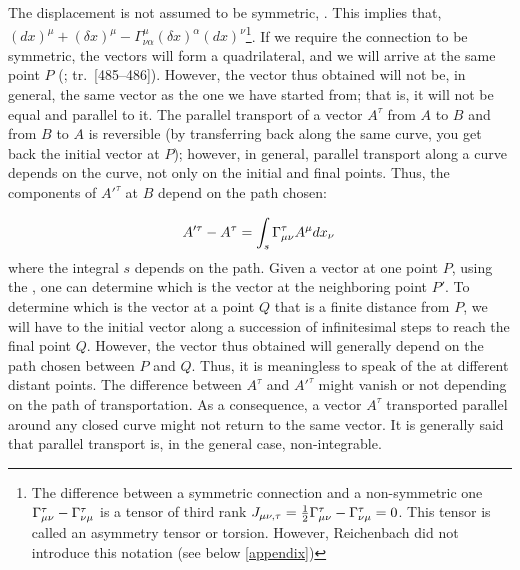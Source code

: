 \documentclass[final]{article}
\renewcommand{\rzlap}[2]{(\cite[#1]{Reichenbach1928}; tr.\ [#2])\xspace}
\begin{document}
%
The displacement is not assumed to be symmetric, \asym. This implies that,  $(d x)^{\mu}+(\delta x)^{\mu}-\Gamma_{\nu \alpha}^{\mu}(\delta x)^{\alpha}(d x)^{\nu}$\footnote{The difference between a symmetric connection and a non-symmetric one $\Gamma^\tau_{\mu\nu}-\Gamma^\tau_{\nu\mu}$ is a tensor of third rank $J_{\mu\nu,\tau}=\frac{1}{2} \Gamma^\tau_{\mu\nu}-\Gamma^\tau_{\nu\mu}=0$. This tensor is called an asymmetry tensor or torsion. However, Reichenbach did not introduce this notation (see below \cref{appendix})}. If we require the connection to be symmetric, the vectors will form a quadrilateral, and we will arrive at the same point $P$ \rzlap{348--349}{485--486}. However, the vector thus obtained will not be, in general, the same vector as the one we have started from; that is, it will not be equal and parallel to it. The parallel transport of a vector $A^\tau$ from $A$ to $B$ and from $B$ to $A$ is reversible (by transferring back along the same curve, you get back the initial vector at $P$); however, in general, parallel transport along a curve depends on the curve, not only on the initial and final points. Thus, the components of $A'^\tau$ at $B$ depend on the path chosen:

\begin{equation*}
A'^{\tau}-A^{\tau}=\int_{s} \Gamma^\tau_{\mu\nu} A^{\mu} d x_{\nu}\,
\end{equation*}
%
where the integral $s$ depends on the path. Given a vector at one point $P$, using the \Gtmn, one can determine which is the  vector at the neighboring point $P'$. To determine which is the  vector at a point $Q$ that is a finite distance from $P$, we will have to  the initial vector along a succession of infinitesimal steps to reach the final point $Q$. However, the vector thus obtained will generally depend on the path chosen between $P$ and $Q$. Thus, it is meaningless to speak of the  at different distant points. The difference between $A^\tau$ and $A'^\tau$ might vanish or not depending on the path of transportation. As a consequence, a vector $A^\tau$ transported parallel around any closed curve might not return to the same vector. It is generally said that parallel transport is, in the general case, non-integrable. 
\end{document}
